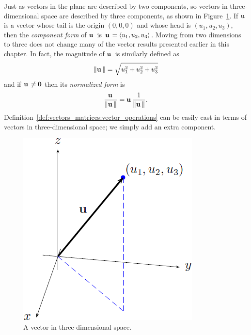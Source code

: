 Just as vectors in the plane are described by two components, so
vectors in three-dimensional space are described by three components,
as shown in Figure~\ref{fig:vectors_matrices:3D_vector}. If $\operatorname*{\mathbf{u}}{}$ is
a vector whose tail is the origin $(0,0,0)$ and whose head is
$(u_1, u_2, u_3)$, then the
\emph{component form} of $\operatorname*{\mathbf{u}}{}$ is
$\operatorname*{\mathbf{u}}{} = \langle u_1, u_2, u_3 \rangle$. Moving from two dimensions to
three does not change many of the vector results presented earlier in
this chapter. In fact, the magnitude of $\operatorname*{\mathbf{u}}{}$ is similarly defined as
%
\begin{equation}
\label{eq:vectors_matrices:magnitude_three_dimensional_vector}
\left\Arrowvert \operatorname*{\mathbf{u}}{} \right\Arrowvert
=
\sqrt{u_1^2 + u_2^2 + u_3^2}
\end{equation}
%
and if $\operatorname*{\mathbf{u}}{} \neq \operatorname*{\textbf{0}}$ then its
\emph{normalized form} is
%
\begin{equation}
\label{eq:normalize_vector_three_dimensions}
\frac{\operatorname*{\mathbf{u}}{}}{\left\Arrowvert \operatorname*{\mathbf{u}}{} \right\Arrowvert}
=
\operatorname*{\mathbf{u}}{} \frac{1}{\left\Arrowvert \operatorname*{\mathbf{u}}{} \right\Arrowvert}.
\end{equation}
%
Definition~\ref{def:vectors_matrices:vector_operations} can be easily
cast in terms of vectors in three-dimensional space; we simply add an
extra component.

\begin{figure}[!htpb]
\centering
\includegraphics[scale=0.8]{images/vector-3d}
\caption{A vector in three-dimensional space.}
\label{fig:vectors_matrices:3D_vector}
\end{figure}

